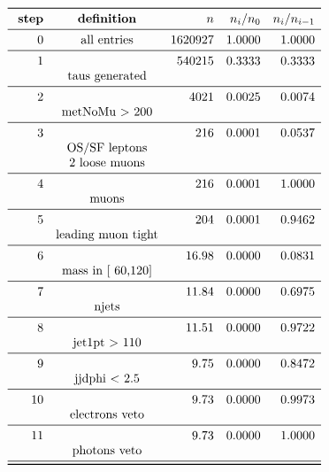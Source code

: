 \documentclass[11pt,a4paper]{article}
\begin{document}
\begin{table}
\caption{\emph{Entries after each selection step, normalised to 5.00 $fb^{-1}$; n is the number of entries after the i-th selection step; Note that cuts on second jet are applied only if a second jet exists with $p_t$ > 30\,GeV.}}
\[
\begin{array}{rcrrr}
\toprule
\ \textbf{step}& \textbf{definition}  & n  &  n_i/n_0 & n_i/n_{i-1}  \\ 
\midrule
 0  & \text{all entries} & 1620927 & 1.0000 & 1.0000 \\
\midrule
 1  & & 540215 & 0.3333 & 0.3333 \\
& \text{taus generated} & & & \\
\midrule
 2  & &   4021 & 0.0025 & 0.0074 \\
& \text{metNoMu > 200} & & & \\
\midrule
 3  & &    216 & 0.0001 & 0.0537 \\
& \text{OS/SF leptons} & & & \\
& \text{2 loose muons} & & & \\
\midrule
 4  & &    216 & 0.0001 & 1.0000 \\
& \text{muons} & & & \\
\midrule
 5  & &    204 & 0.0001 & 0.9462 \\
& \text{leading muon tight} & & & \\
\midrule
 6  & &  16.98 & 0.0000 & 0.0831 \\
& \text{mass in [ 60,120]} & & & \\
\midrule
 7  & &  11.84 & 0.0000 & 0.6975 \\
& \text{njets} & & & \\
\midrule
 8  & &  11.51 & 0.0000 & 0.9722 \\
& \text{jet1pt >  110} & & & \\
\midrule
 9  & &   9.75 & 0.0000 & 0.8472 \\
& \text{jjdphi < 2.5} & & & \\
\midrule
 10  & &   9.73 & 0.0000 & 0.9973 \\
& \text{electrons veto} & & & \\
\midrule
 11  & &   9.73 & 0.0000 & 1.0000 \\
& \text{photons veto} & & & \\
\midrule
\bottomrule
\end{array}
\]
\end{table}
\end{document}
